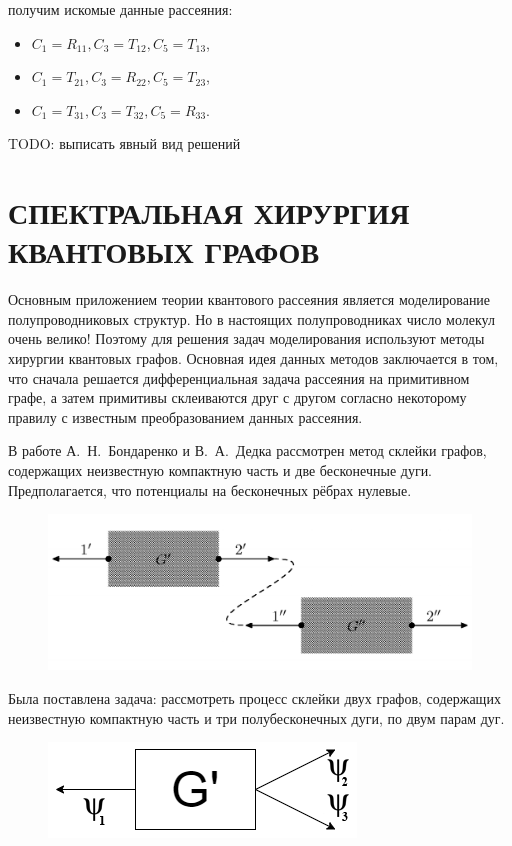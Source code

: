 \documentclass[a4 paper, 12 pt]{extarticle}
\begin{document}
   получим искомые данные рассеяния:
   \begin{itemize}
  	 \item $C_1 = R_{11}, C_3 = T_{12}, C_5 = T_{13}$, 
  	 \item $C_1 = T_{21}, C_3 = R_{22}, C_5 = T_{23}$,  
 	 \item $C_1 = T_{31}, C_3 = T_{32}, C_5 = R_{33}$.
   \end{itemize}

   TODO: выписать явный вид решений
   
   \pagebreak
   
   \section{СПЕКТРАЛЬНАЯ ХИРУРГИЯ КВАНТОВЫХ ГРАФОВ}
   Основным приложением теории квантового рассеяния является моделирование полупроводниковых структур. Но в настоящих полупроводниках число молекул очень велико! Поэтому для решения задач моделирования используют методы хирургии квантовых графов. Основная идея данных методов заключается в том, что сначала решается дифференциальная задача рассеяния на примитивном графе, а затем примитивы склеиваются друг с другом согласно некоторому правилу с известным преобразованием данных рассеяния.
   
   В работе А.~Н.~Бондаренко и В.~А.~Дедка \cite{SpectralSurgery} рассмотрен метод склейки графов, содержащих неизвестную компактную часть и две бесконечные дуги. Предполагается, что потенциалы на бесконечных рёбрах нулевые.
   \begin{figure}[!htb]
   	\centering
   	\includegraphics[scale=0.3]{skleika1.png}
   \end{figure}

   Была поставлена задача: рассмотреть процесс склейки двух графов, содержащих неизвестную компактную часть и три полубесконечных дуги, по двум парам дуг.
   \begin{figure}[!htb]
   	\centering
   	\includegraphics[scale=0.5]{g_prime.png}
   \end{figure}
\end{document}
